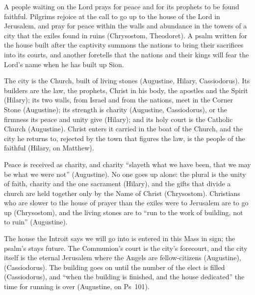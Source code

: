 \begin{fourSenses}
\item[Literal.] A people waiting on the Lord prays for peace and for its
prophets to be found faithful. Pilgrims rejoice at the call to go up to the
house of the Lord in Jerusalem, and pray for peace within the walls and
abundance in the towers of a city that the exiles found in ruins
(Chrysostom, Theodoret). A psalm written for the house built after the
captivity summons the nations to bring their sacrifices into its courts, and
another foretells that the nations and their kings will fear the Lord's name
when he has built up Sion.

\item[Allegorical.] The city is the Church, built of living stones
(Augustine, Hilary, Cassiodorus). Its builders are the law, the prophets,
Christ in his body, the apostles and the Spirit (Hilary); its two walls, from
Israel and from the nations, meet in the Corner Stone (Augustine); its strength
is charity (Augustine, Cassiodorus), or the firmness its peace and unity give
(Hilary); and its holy court is the Catholic Church (Augustine). Christ enters
it carried in the boat of the Church, and the city he returns to, rejected by
the town that figures the law, is the people of the faithful (Hilary, on
Matthew).

\item[Moral.] Peace is received as charity, and charity ``slayeth what we have
been, that we may be what we were not'' (Augustine). No one goes up alone: the
plural  is the unity of faith, charity and the one sacrament
(Hilary), and the gifts that divide a church are held together only by the Name
of Christ (Chrysostom). Christians who are slower to the house of prayer than
the exiles were to Jerusalem are to go up (Chrysostom), and the living stones
are to ``run to the work of building, not to ruin'' (Augustine).

\item[Anagogical.] The house the Introit says we will go into is entered in this
Mass in sign; the psalm's  stays future. The Communion's court is
the city's forecourt, and the city itself is the eternal Jerusalem where the
Angels are fellow-citizens (Augustine),  (Cassiodorus). The building goes on until the number of the elect is
filled (Cassiodorus), and ``when the building is finished, and the house
dedicated'' the time for running is over (Augustine, on Ps~101).
\end{fourSenses}
